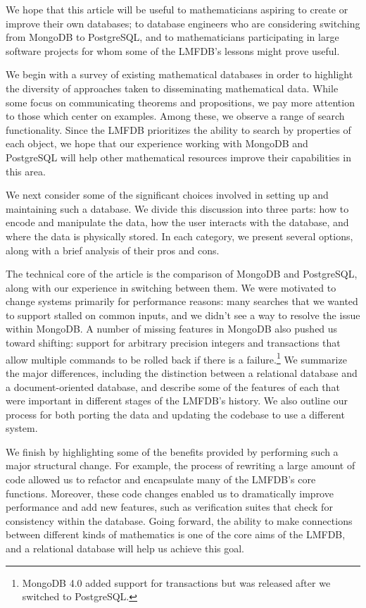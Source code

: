 \documentclass{amsart}
\begin{document}
We hope that this article will be useful to mathematicians aspiring to create or improve their own databases; to database engineers who are considering switching from MongoDB to PostgreSQL, and to mathematicians participating in large software projects for whom some of the LMFDB's lessons might prove useful.

We begin with a survey of existing mathematical databases in order to highlight the diversity of approaches taken to disseminating mathematical data.
While some focus on communicating theorems and propositions, we pay more attention to those which center on examples.
Among these, we observe a range of search functionality.
Since the LMFDB prioritizes the ability to search by properties of each object, we hope that our experience working with MongoDB and PostgreSQL will help other mathematical resources improve their capabilities in this area.

We next consider some of the significant choices involved in setting up and maintaining such a database.
We divide this discussion into three parts: how to encode and manipulate the data, how the user interacts with the database, and where the data is physically stored.
In each category, we present several options, along with a brief analysis of their pros and cons.

The technical core of the article is the comparison of MongoDB and PostgreSQL, along with our experience in switching between them.
We were motivated to change systems primarily for performance reasons: many searches that we wanted to support stalled on common inputs, and we didn't see a way to resolve the issue within MongoDB.
A number of missing features in MongoDB also pushed us toward shifting: support for arbitrary precision integers and transactions that allow multiple commands to be rolled back if there is a failure.\footnote{MongoDB 4.0 added support for transactions but was released after we switched to PostgreSQL.}
We summarize the major differences, including the distinction between a relational database and a document-oriented database, and describe some of the features of each that were important in different stages of the LMFDB's history.
We also outline our process for both porting the data and updating the codebase to use a different system.

We finish by highlighting some of the benefits provided by performing such a major structural change.
For example, the process of rewriting a large amount of code allowed us to refactor and encapsulate many of the LMFDB's core functions.
Moreover, these code changes enabled us to dramatically improve performance and add new features, such as verification suites that check for consistency within the database.
Going forward, the ability to make connections between different kinds of mathematics is one of the core aims of the LMFDB, and a relational database will help us achieve this goal.
\end{document}
